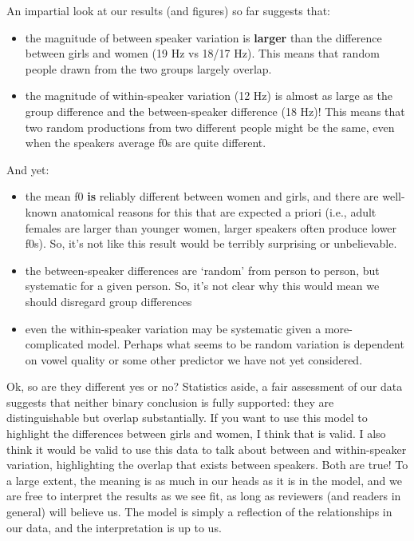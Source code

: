 \documentclass[
]{book}
\begin{document}
An impartial look at our results (and figures) so far suggests that:

\begin{itemize}
\item
  the magnitude of between speaker variation is \textbf{larger} than the difference between girls and women (19 Hz vs 18/17 Hz). This means that random people drawn from the two groups largely overlap.
\item
  the magnitude of within-speaker variation (12 Hz) is almost as large as the group difference and the between-speaker difference (18 Hz)! This means that two random productions from two different people might be the same, even when the speakers average f0s are quite different.
\end{itemize}

And yet:

\begin{itemize}
\item
  the mean f0 \textbf{is} reliably different between women and girls, and there are well-known anatomical reasons for this that are expected a priori (i.e., adult females are larger than younger women, larger speakers often produce lower f0s). So, it's not like this result would be terribly surprising or unbelievable.
\item
  the between-speaker differences are `random' from person to person, but systematic for a given person. So, it's not clear why this would mean we should disregard group differences
\item
  even the within-speaker variation may be systematic given a more-complicated model. Perhaps what seems to be random variation is dependent on vowel quality or some other predictor we have not yet considered.
\end{itemize}

Ok, so are they different yes or no? Statistics aside, a fair assessment of our data suggests that neither binary conclusion is fully supported: they are distinguishable but overlap substantially. If you want to use this model to highlight the differences between girls and women, I think that is valid. I also think it would be valid to use this data to talk about between and within-speaker variation, highlighting the overlap that exists between speakers. Both are true! To a large extent, the meaning is as much in our heads as it is in the model, and we are free to interpret the results as we see fit, as long as reviewers (and readers in general) will believe us. The model is simply a reflection of the relationships in our data, and the interpretation is up to us.
\end{document}
